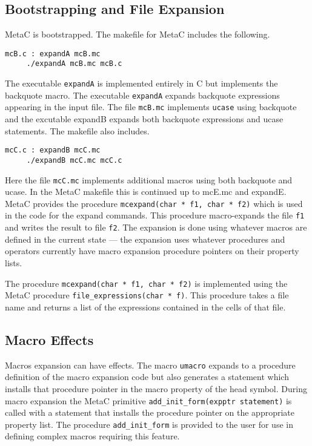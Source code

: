 \documentclass{article}
\begin{document}
\subsection{Bootstrapping and File Expansion}
\label{sec:bootstrap}

MetaC is bootstrapped.  The makefile for MetaC includes the following.
\begin{verbatim}
mcB.c : expandA mcB.mc
	 ./expandA mcB.mc mcB.c
\end{verbatim}
The executable {\tt expandA} is implemented entirely in C but implements the backquote macro.  The executable {\tt expandA}
expands backquote expressions appearing in the input file. The file {\tt mcB.mc} implements {\tt ucase} using backquote
and the excutable expandB expands both backquote expressions and ucase statements.
The makefile also includes.
\begin{verbatim}
mcC.c : expandB mcC.mc
	 ./expandB mcC.mc mcC.c
\end{verbatim}
Here the file {\tt mcC.mc} implements additional macros using both backquote and ucase.  In the MetaC makefile this is continued up to mcE.mc and expandE.
MetaC provides the procedure
{\tt mcexpand(char * f1, char * f2)} which is used in the code for the expand commands.  This procedure macro-expands the
file {\tt f1} and writes the result to file {\tt f2}.  The expansion is done using whatever macros are defined
in the current state --- the expansion uses whatever procedures and operators currently
have macro expansion procedure pointers on their property lists.

The procedure {\tt mcexpand(char * f1, char * f2)} is implemented using the MetaC procedure {\tt file\_expressions(char * f)}.
This procedure takes a file name and returns a list of the expressions contained in the cells of that file.

\subsection{Macro Effects}


Macros expansion can have effects.  The macro {\tt umacro} expands to a procedure definition of the macro expansion code but also
generates a statement which installs that procedure pointer in the macro property of the head symbol.  During macro expansion the
MetaC primitive {\tt add\_init\_form(expptr statement)} is called with a statement that installs the procedure pointer on the appropriate property list.  The procedure {\tt add\_init\_form} is provided to the user for use in defining complex macros
requiring this feature.
\end{document}
